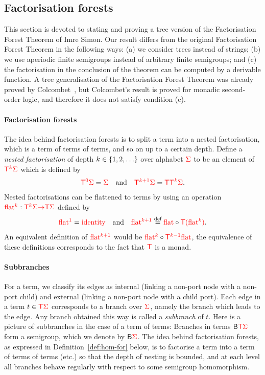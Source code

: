 \subsection{Factorisation forests}
\label{sec:factfor}
This section is devoted to stating and proving a tree version of the Factorisation Forest Theorem of Imre Simon.  Our result differs from the original Factorisation Forest Theorem in the following ways: (a) we consider trees instead of strings; (b) we use aperiodic finite semigroups instead of arbitrary finite semigroups; and (c) the factorisation in the conclusion of the theorem can be computed by a derivable function.  A tree generalisation of the Factorisation Forest Theorem was already proved by Colcombet~\cite[Theorem 1 and Section 3.3]{colcombetCombinatorialTheoremTrees2007}, but Colcombet's result is proved for monadic second-order logic, and therefore it does not satisfy condition (c). 



\paragraph{Factorisation forests} The idea behind factorisation forests is to split a term into a nested factorisation, which is a term of terms of terms, and so on up to a certain depth.  
Define a \emph{nested factorisation} of depth $k \in \{1,2,\ldots\}$ over alphabet ${\color{red}{\Sigma}}$ to be an element of ${\color{red}{\mathsf T}}^{{\color{red}{k}}} {\color{red}{\Sigma}}$ which is defined by
\begin{align*}
{\color{red}{\mathsf T}}^{{\color{red}{0}}} {\color{red}{\Sigma}} = {\color{red}{\Sigma}}  \quad \text{and} \quad {\color{red}{\mathsf T}}^{{\color{red}{k+1}}}{\color{red}{\Sigma}} = {\color{red}{\mathsf T}} {\color{red}{\mathsf T}}^{{\color{red}{k}}} {\color{red}{\Sigma}}.
\end{align*}
Nested factorisations can be flattened to terms by using an  operation ${\color{red}{\mathrm{flat}}}^{{\color{red}{k}}} : {\color{red}{\mathsf T}}^{{\color{red}{k}}} {\color{red}{\Sigma}} {\color{red}{\to}} {\color{red}{\mathsf T}} {\color{red}{\Sigma}} $ defined by 
\begin{align*}
     {\color{red}{\mathrm{flat}}}^{{\color{red}{1}}} = \text{{\color{red}{identity}}} \quad \text{and} \quad  {\color{red}{\mathrm{flat}}}^{{\color{red}{k+1}}} \stackrel{\text{def}}= {\color{red}{\mathrm{flat}}}  \circ {\color{red}{\mathsf T}} {\color{red}{(}} {\color{red}{\mathrm{flat}}}^{{\color{red}{k}}}{\color{red}{)}}.
\end{align*}
An equivalent definition of ${\color{red}{\mathrm{flat}}}^{{\color{red}{k+1}}}$ would be ${\color{red}{\mathrm{flat}}}^{{\color{red}{k}}} \circ {\color{red}{\mathsf T}}^{{\color{red}{k-1}}} {\color{red}{\mathrm{flat}}}$, the equivalence of these definitions corresponds to the fact that ${\color{red}{\mathsf T}}$ is a monad.


\paragraph{Subbranches}
For a term, we classify its edges as internal (linking a non-port node with a non-port child) and external (linking a non-port node with a child port). Each edge in a term $t \in {\color{red}{\mathsf T}} {\color{red}{\Sigma}}$ corresponds to a branch over ${\color{red}{\Sigma}}$, namely the branch which leads to the edge. Any branch obtained this way is called a \emph{subbranch} of $t$. Here is a picture of subbranches in the case of a term of terms:
Branches in  terms $\mathsf{B} {\color{red}{\mathsf T}} {\color{red}{\Sigma}}$  form a semigroup, which we denote by $\mathsf{B} {\color{red}{\Sigma}}$. 
The idea behind factorisation forests, as expressed in Definition~\ref{def:hom-for} below, is to factorise a term into a term of terms of terms (etc.) so that the depth of nesting is bounded, and at each level all branches behave regularly with respect to some semigroup homomorphism. 

